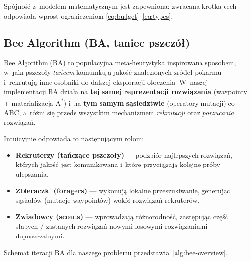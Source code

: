 Spójność z~modelem matematycznym jest zapewniona: zwracana krotka cech
odpowiada wprost ograniczeniom \eqref{eq:budget}--\eqref{eq:types}.

\subsection{Bee Algorithm (BA, taniec pszczół)}
\label{sec:bee}

Bee Algorithm (BA) to populacyjna meta-heurystyka inspirowana sposobem, w~jaki
pszczoły \emph{tańcem} komunikują jakość znalezionych źródeł pokarmu i~rekrutują
inne osobniki do dalszej eksploracji otoczenia. W~naszej implementacji BA działa
na \textbf{tej samej reprezentacji rozwiązania} (waypointy + materializacja
A\textsuperscript{*}) i~na \textbf{tym samym sąsiedztwie} (operatory mutacji) co
ABC, a~różni się przede wszystkim mechanizmem \emph{rekrutacji} oraz
\emph{porzucania} rozwiązań.

Intuicyjnie odpowiada to następującym rolom:
\begin{itemize}
    \item \textbf{Rekruterzy (tańczące pszczoły)} --- podzbiór najlepszych rozwiązań,
          których jakość jest komunikowana i~które przyciągają kolejne próby
          ulepszania.
    \item \textbf{Zbieraczki (foragers)} --- wykonują lokalne przeszukiwanie,
          generując sąsiadów (mutacje waypointów) wokół rozwiązań-rekruterów.
    \item \textbf{Zwiadowcy (scouts)} --- wprowadzają różnorodność, zastępując część
          słabych / zastanych rozwiązań nowymi losowymi rozwiązaniami dopuszczalnymi.
\end{itemize}

Schemat iteracji BA dla naszego problemu przedstawia~\cref{alg:bee-overview}.

